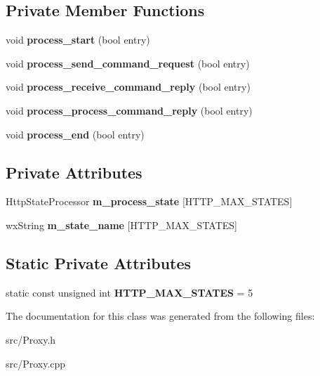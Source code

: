 \subsection*{Private Member Functions}
\begin{DoxyCompactItemize}
\item 
void {\bfseries process\_\-start} (bool entry)\label{classCHttpStateMachine_a6087f284d6277d76e1452a2db160616e}

\item 
void {\bfseries process\_\-send\_\-command\_\-request} (bool entry)\label{classCHttpStateMachine_acb72b0bf7901048136c65c2475914e0a}

\item 
void {\bfseries process\_\-receive\_\-command\_\-reply} (bool entry)\label{classCHttpStateMachine_a94e614e01c4fc60edc8c770b924087ef}

\item 
void {\bfseries process\_\-process\_\-command\_\-reply} (bool entry)\label{classCHttpStateMachine_a95a88de38bd16dcea4d7ed7e156d2131}

\item 
void {\bfseries process\_\-end} (bool entry)\label{classCHttpStateMachine_a07454d056fb2d8d73837afa8d8538989}

\end{DoxyCompactItemize}
\subsection*{Private Attributes}
\begin{DoxyCompactItemize}
\item 
HttpStateProcessor {\bfseries m\_\-process\_\-state} [HTTP\_\-MAX\_\-STATES]\label{classCHttpStateMachine_a62b4c75a951556a742efd81f0ff87fb7}

\item 
wxString {\bfseries m\_\-state\_\-name} [HTTP\_\-MAX\_\-STATES]\label{classCHttpStateMachine_a1e09512a76a0eda9ad6881b9632adaae}

\end{DoxyCompactItemize}
\subsection*{Static Private Attributes}
\begin{DoxyCompactItemize}
\item 
static const unsigned int {\bfseries HTTP\_\-MAX\_\-STATES} = 5\label{classCHttpStateMachine_ab4e74cd39c9c85a8449b8b87811998be}

\end{DoxyCompactItemize}


The documentation for this class was generated from the following files:\begin{DoxyCompactItemize}
\item 
src/Proxy.h\item 
src/Proxy.cpp\end{DoxyCompactItemize}
